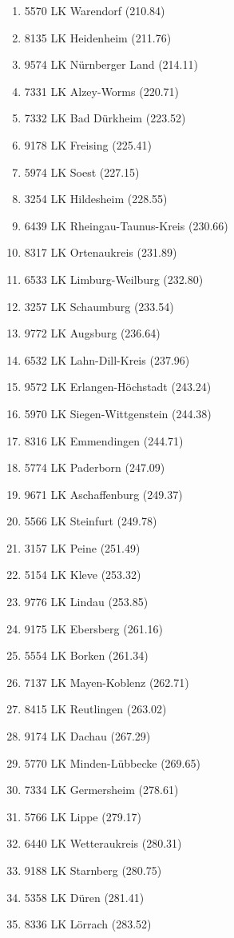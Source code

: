 \begin{enumerate}[itemsep=-6mm]
\item 5570 LK Warendorf (210.84)
\item 8135 LK Heidenheim (211.76)
\item 9574 LK Nürnberger Land (214.11)
\item 7331 LK Alzey-Worms (220.71)
\item 7332 LK Bad Dürkheim (223.52)
\item 9178 LK Freising (225.41)
\item 5974 LK Soest (227.15)
\item 3254 LK Hildesheim (228.55)
\item 6439 LK Rheingau-Taunus-Kreis (230.66)
\item 8317 LK Ortenaukreis (231.89)
\item 6533 LK Limburg-Weilburg (232.80)
\item 3257 LK Schaumburg (233.54)
\item 9772 LK Augsburg (236.64)
\item 6532 LK Lahn-Dill-Kreis (237.96)
\item 9572 LK Erlangen-Höchstadt (243.24)
\item 5970 LK Siegen-Wittgenstein (244.38)
\item 8316 LK Emmendingen (244.71)
\item 5774 LK Paderborn (247.09)
\item 9671 LK Aschaffenburg (249.37)
\item 5566 LK Steinfurt (249.78)
\item 3157 LK Peine (251.49)
\item 5154 LK Kleve (253.32)
\item 9776 LK Lindau (253.85)
\item 9175 LK Ebersberg (261.16)
\item 5554 LK Borken (261.34)
\item 7137 LK Mayen-Koblenz (262.71)
\item 8415 LK Reutlingen (263.02)
\item 9174 LK Dachau (267.29)
\item 5770 LK Minden-Lübbecke (269.65)
\item 7334 LK Germersheim (278.61)
\item 5766 LK Lippe (279.17)
\item 6440 LK Wetteraukreis (280.31)
\item 9188 LK Starnberg (280.75)
\item 5358 LK Düren (281.41)
\item 8336 LK Lörrach (283.52)

\end{enumerate}
